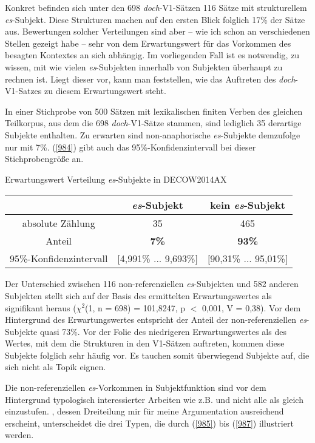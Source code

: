 {Konkret befinden sich unter den 698 \textit{doch}-V1-Sätzen 116 Sätze mit strukturellem \textit{es}-Subjekt. Diese Strukturen machen auf den ersten Blick folglich 17\% der Sätze aus. Bewertungen solcher Verteilungen sind aber – wie ich schon an verschiedenen Stellen gezeigt habe – sehr von dem Erwartungswert für das Vorkommen des besagten Kontextes an sich abhängig. Im vorliegenden Fall ist es notwendig, zu wissen, mit wie vielen \textit{es}-Subjekten innerhalb von Subjekten überhaupt zu rechnen ist. Liegt dieser vor, kann man feststellen, wie das Auftreten des \textit{doch}-V1-Satzes zu diesem Erwartungswert steht.	

In einer Stichprobe von 500 Sätzen mit lexikalischen finiten Verben des glei\-chen Teilkorpus, aus dem die 698 \textit{doch}-V1-Sätze stammen, sind lediglich 35 derartige Subjekte enthalten. Zu erwarten sind non-anaphorische \textit{es}-Subjekte demzufolge nur mit 7\%. (\ref{984}) gibt auch das 95\%-Konfidenzintervall bei dieser Stichprobengröße an.

\begin{exe}
	\ex\label{984}Erwartungswert Verteilung \textit{es}-Subjekte in DECOW2014AX\\[-1em]		
 		\begin{tabular}[t]{|c|c|c|} 
 		\hline 	
   	 	& \textbf{\textit{es}-Subjekt} & \textbf{kein \textit{es}-Subjekt} \\
   	 	\hline 
  		absolute Zählung & 35 & 465\\ 
   		\hline
   		Anteil & \textbf{7\%} & \textbf{93\%}\\
   		\hline
   		95\%-Konfidenzintervall & $[$4,991\% ... 9,693\%$]$ & $[$90,31\% ... 95,01\%$]$ \\
   		\hline
 		\end{tabular}
\end{exe}
Der Unterschied zwischen 116 non-referenziellen \textit{es}-Subjekten und 582 anderen Subjekten stellt sich auf der Basis des ermittelten Erwartungswertes als signifikant heraus ($\chi^{2}$(1, n = 698) = 101,8247, p $<$ 0,001, V = 0,38). Vor dem Hintergrund des Erwartungswertes entspricht der Anteil der non-referenziellen \textit{es}-Subjekte quasi 73\%. Vor der Folie des niedrigeren Erwartungswertes als des Wertes, mit dem die Strukturen in den V1-Sätzen auftreten, kommen diese Subjekte folglich sehr häufig vor. Es tauchen somit überwiegend Subjekte auf, die sich nicht als Topik eignen.

Die non-referenziellen \textit{es}-Vorkommen in Subjektfunktion sind vor dem Hintergrund typologisch interessierter Arbeiten wie z.B. \citet{Askedal1990} und \citet{Zitterbart2002} nicht alle als gleich einzustufen. \citet{Speyer2009}, dessen Dreiteilung mir für meine Argumentation ausreichend erscheint, unterscheidet die drei Typen, die durch (\ref{985}) bis (\ref{987}) illustriert werden.   

}
